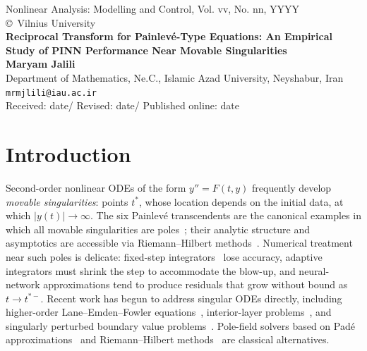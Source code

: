 \documentclass[a4paper, 10pt]{article}
\theoremstyle{definition}
\begin{document}
\begin{center}
Nonlinear Analysis: Modelling and Control, Vol. vv, No. nn, YYYY\\
\copyright\ Vilnius University\\[24pt]
\LARGE
\textbf{Reciprocal Transform for Painlev\'e-Type Equations: An Empirical Study of PINN Performance Near Movable Singularities}\\[6pt]
\small
\textbf {Maryam Jalili}\\[6pt]
Department of Mathematics, Ne.C., Islamic Azad University, Neyshabur, Iran \\ \texttt{mrmjlili@iau.ac.ir}\\[6pt]
Received: date\quad/\quad
Revised: date\quad/\quad
Published online: date
\end{center}

\begin{abstract}
We investigate the performance of physics-informed neural networks (PINNs) for second-order ODEs with movable singularities, focusing on \(y''=y^3\) and Painlev\'e II. We compare three representations: direct, rapidity, and reciprocal transform \(w=1/y\). The reciprocal representation reduces median near-pole error by up to three orders of magnitude but exhibits a 20\% seed failure rate and a weak residual--error correlation. A double-pole test (\(y''=6y^2\)) yields a fitted scaling of \(\delta^{-2.06}\). The PINN is not competitive with DOP853 for single solves. These findings highlight both potential and limitations of PINNs for singular ODEs.

\vskip 2mm
\textbf{Keywords:} movable singularities, Painlev\'e equations, physics-informed neural networks, empirical study, near-pole error. \textbf{MSC 2020:} 34M55, 34M35, 65L05, 68T07.
\end{abstract}

\section{Introduction}
\label{sec:intro}

Second-order nonlinear ODEs of the form \(y'' = F(t, y)\) frequently develop \emph{movable singularities}: points \(t^*\), whose location depends on the initial data, at which \(|y(t)| \to \infty\). The six Painlev\'e transcendents are the canonical examples in which all movable singularities are poles~\cite{Ince1956,Gromak2002,Conte2008,Clarkson2003}; their analytic structure and asymptotics are accessible via Riemann--Hilbert methods~\cite{Deift1995,Fokas2006}. Numerical treatment near such poles is delicate: fixed-step integrators~\cite{Butcher2016,Hairer1993} lose accuracy, adaptive integrators must shrink the step to accommodate the blow-up, and neural-network approximations tend to produce residuals that grow without bound as \(t \to t^{*-}\). Recent work has begun to address singular ODEs directly, including higher-order Lane--Emden--Fowler equations~\cite{Baty2023}, interior-layer problems~\cite{Chang2024}, and singularly perturbed boundary value problems~\cite{Israr2025}. Pole-field solvers based on Pad{\'e} approximations~\cite{Fornberg2011} and Riemann--Hilbert methods~\cite{DLMF32} are classical alternatives.
\end{document}
